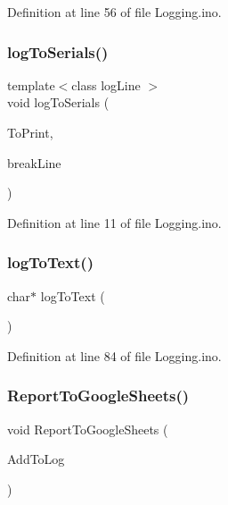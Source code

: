 Definition at line 56 of file Logging.\+ino.

\mbox{\label{_logging_8ino_ae322bfa37a28b422a3bf210b592ce53d}} 
\subsubsection{\texorpdfstring{logToSerials()}{logToSerials()}}
{\footnotesize\ttfamily template$<$class log\+Line $>$ \\
void log\+To\+Serials (\begin{DoxyParamCaption}\item[{log\+Line}]{To\+Print,  }\item[{bool}]{break\+Line }\end{DoxyParamCaption})}



Definition at line 11 of file Logging.\+ino.

\mbox{\label{_logging_8ino_ab89ffa5b586c2c00bd945abc537249bb}} 
\subsubsection{\texorpdfstring{logToText()}{logToText()}}
{\footnotesize\ttfamily char$\ast$ log\+To\+Text (\begin{DoxyParamCaption}{ }\end{DoxyParamCaption})}



Definition at line 84 of file Logging.\+ino.

\mbox{\label{_logging_8ino_ad1bb4c1aefdc19ace1f33fd1d8121a4e}} 
\subsubsection{\texorpdfstring{ReportToGoogleSheets()}{ReportToGoogleSheets()}}
{\footnotesize\ttfamily void Report\+To\+Google\+Sheets (\begin{DoxyParamCaption}\item[{bool}]{Add\+To\+Log }\end{DoxyParamCaption})}



